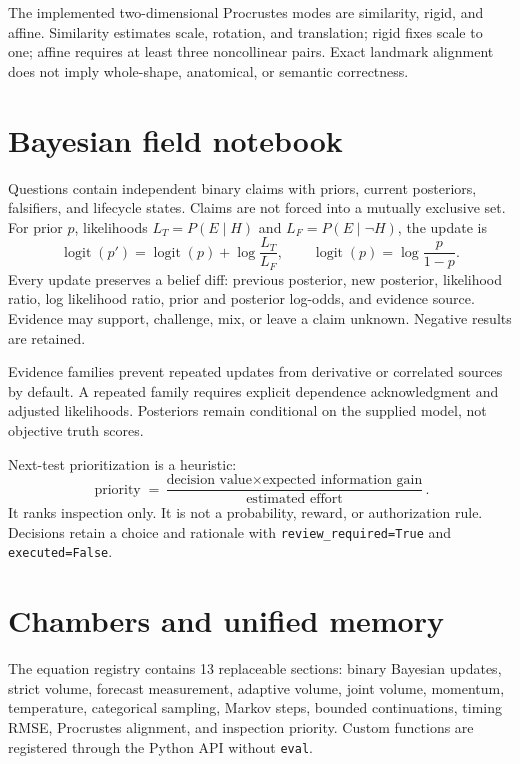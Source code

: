 \documentclass[11pt,a4paper]{article}
\begin{document}
The implemented two-dimensional Procrustes modes are similarity, rigid, and affine. Similarity estimates scale, rotation, and translation; rigid fixes scale to one; affine requires at least three noncollinear pairs. Exact landmark alignment does not imply whole-shape, anatomical, or semantic correctness.

\section{Bayesian field notebook}
Questions contain independent binary claims with priors, current posteriors, falsifiers, and lifecycle states. Claims are not forced into a mutually exclusive set. For prior $p$, likelihoods $L_T=P(E\mid H)$ and $L_F=P(E\mid\neg H)$, the update is
\begin{equation}
\operatorname{logit}(p')=\operatorname{logit}(p)+\log\frac{L_T}{L_F},
\qquad \operatorname{logit}(p)=\log\frac{p}{1-p}.
\end{equation}
Every update preserves a belief diff: previous posterior, new posterior, likelihood ratio, log likelihood ratio, prior and posterior log-odds, and evidence source. Evidence may support, challenge, mix, or leave a claim unknown. Negative results are retained.

Evidence families prevent repeated updates from derivative or correlated sources by default. A repeated family requires explicit dependence acknowledgment and adjusted likelihoods. Posteriors remain conditional on the supplied model, not objective truth scores.

Next-test prioritization is a heuristic:
\begin{equation}
\operatorname{priority}=\frac{\text{decision value}\times\text{expected information gain}}{\text{estimated effort}}.
\end{equation}
It ranks inspection only. It is not a probability, reward, or authorization rule. Decisions retain a choice and rationale with \texttt{review\_required=True} and \texttt{executed=False}.

\section{Chambers and unified memory}
The equation registry contains 13 replaceable sections: binary Bayesian updates, strict volume, forecast measurement, adaptive volume, joint volume, momentum, temperature, categorical sampling, Markov steps, bounded continuations, timing RMSE, Procrustes alignment, and inspection priority. Custom functions are registered through the Python API without \texttt{eval}.
\end{document}
